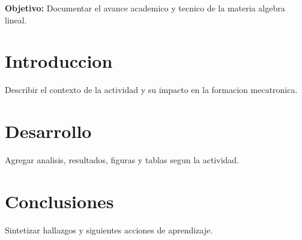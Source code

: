 \documentclass[spanish,letterpaper,oneside]{article}
\begin{document}
\templatePortrait
\templatePagecfg
\onehalfspacing

\begin{abstractd}
\textbf{Objetivo:} Documentar el avance academico y tecnico de la materia algebra lineal.
\end{abstractd}

\templateIndex
\templateFinalcfg

\section{Introduccion}
Describir el contexto de la actividad y su impacto en la formacion mecatronica.

\section{Desarrollo}
Agregar analisis, resultados, figuras y tablas segun la actividad.

\section{Conclusiones}
Sintetizar hallazgos y siguientes acciones de aprendizaje.



\end{document}

